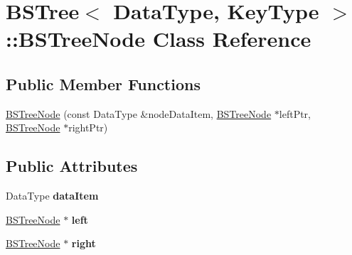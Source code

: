 \hypertarget{class_b_s_tree_1_1_b_s_tree_node}{\section{B\+S\+Tree$<$ Data\+Type, Key\+Type $>$\+:\+:B\+S\+Tree\+Node Class Reference}
\label{class_b_s_tree_1_1_b_s_tree_node}
}
\subsection*{Public Member Functions}
\begin{DoxyCompactItemize}
\item 
\hyperlink{class_b_s_tree_1_1_b_s_tree_node_a40f0e1ccea243f6d47b5c1b0a2913ff8}{B\+S\+Tree\+Node} (const Data\+Type \&node\+Data\+Item, \hyperlink{class_b_s_tree_1_1_b_s_tree_node}{B\+S\+Tree\+Node} $\ast$left\+Ptr, \hyperlink{class_b_s_tree_1_1_b_s_tree_node}{B\+S\+Tree\+Node} $\ast$right\+Ptr)
\end{DoxyCompactItemize}
\subsection*{Public Attributes}
\begin{DoxyCompactItemize}
\item 
\hypertarget{class_b_s_tree_1_1_b_s_tree_node_a507c8d6dde1b8d35d9af6b4e78f38962}{Data\+Type {\bfseries data\+Item}}\label{class_b_s_tree_1_1_b_s_tree_node_a507c8d6dde1b8d35d9af6b4e78f38962}

\item 
\hypertarget{class_b_s_tree_1_1_b_s_tree_node_a7a90150dd249432e240dc363955c5ca1}{\hyperlink{class_b_s_tree_1_1_b_s_tree_node}{B\+S\+Tree\+Node} $\ast$ {\bfseries left}}\label{class_b_s_tree_1_1_b_s_tree_node_a7a90150dd249432e240dc363955c5ca1}

\item 
\hypertarget{class_b_s_tree_1_1_b_s_tree_node_a8d7bfd0208a562c8b8ab332e1d796563}{\hyperlink{class_b_s_tree_1_1_b_s_tree_node}{B\+S\+Tree\+Node} $\ast$ {\bfseries right}}\label{class_b_s_tree_1_1_b_s_tree_node_a8d7bfd0208a562c8b8ab332e1d796563}

\end{DoxyCompactItemize}



